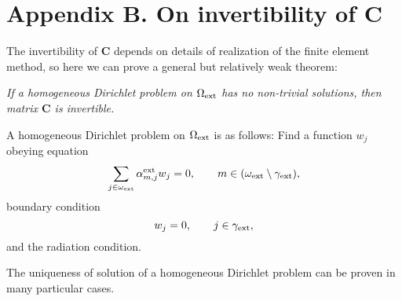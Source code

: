 \documentclass[12pt]{article}
\newcommand{\rex}{{\rm ext}}
\newcommand{\C}{\mathbf{C}}
\begin{document}
\section{Appendix B. On invertibility of $\C$}
\label{sec:AppB}

The invertibility of $\C$ depends on details of realization of the finite element method, so here we can prove
a general but relatively weak theorem:

{\em If a homogeneous Dirichlet problem on $\Omega_\rex$ has no non-trivial solutions, then matrix $\C$
is invertible.}

A homogeneous Dirichlet problem on $\Omega_\rex$ is as follows: Find a function $w_j$ obeying equation
\begin{equation}
\sum_{j \in \omega_\rex}  \alpha^\rex_{m,j} w_{j} = 0,
\qquad
m \in (\omega_\rex \setminus \gamma_\rex),
\label{eqB01}
\end{equation}
boundary condition
\begin{equation}
w_j = 0 ,
\qquad
j \in \gamma_\rex,
\label{eqB02}
\end{equation}
and the radiation condition.

The uniqueness of solution of a homogeneous Dirichlet problem can be proven
in many particular cases.
\end{document}
